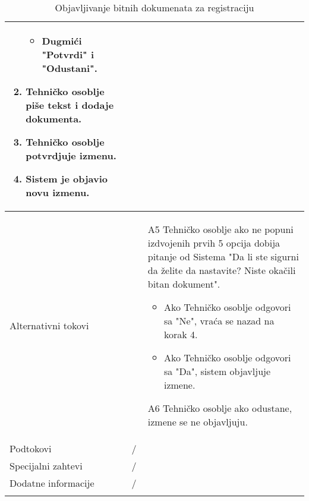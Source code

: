\documentclass{article}
\begin{document}
\begin{longtable}{| p{} | p{} |}
\begin{enumerate}
\begin{itemize}
                        \item Dugmići "Potvrdi" i "Odustani".
                    \end{itemize}
                    \item Tehničko osoblje piše tekst i dodaje dokumenta.
                    \item Tehničko osoblje potvrdjuje izmenu.
                    \item Sistem je objavio novu izmenu.
                \end{enumerate}\\
            \hline
                Alternativni tokovi & 
                \begin{itemize}
                    \item[A5] Tehničko osoblje ako ne popuni izdvojenih prvih 5 opcija dobija pitanje od Sistema "Da li ste sigurni da želite da nastavite? Niste okačili bitan dokument". 
                        \begin{itemize}
                            \item Ako Tehničko osoblje odgovori sa "Ne", vraća se nazad na korak 4. 
                            \item Ako Tehničko osoblje odgovori sa "Da", sistem objavljuje izmene.
                        \end{itemize}
                    \item[A6] Tehničko osoblje ako odustane, izmene se ne objavljuju.
                \end{itemize}\\
            \hline
                Podtokovi & /\\
            \hline
                Specijalni zahtevi & /\\
            \hline
                Dodatne informacije & /\\
            \hline
            \caption{Objavljivanje bitnih dokumenata za registraciju}
        \end{longtable}
\end{document}
